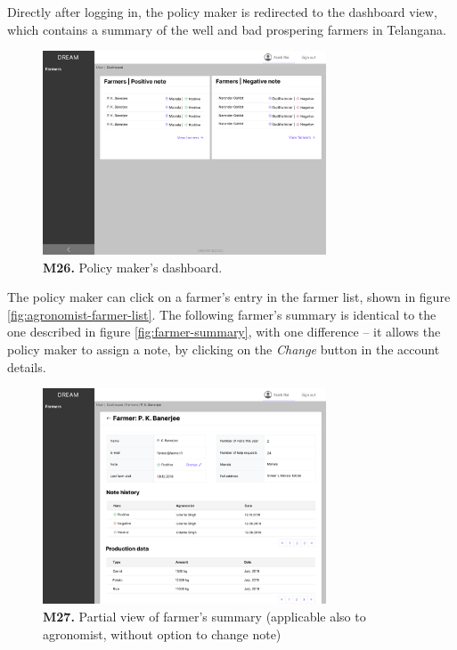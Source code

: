     Directly after logging in, the policy maker is redirected to the dashboard view, which contains a summary of the well and bad prospering farmers in Telangana.
    \begin{figure}[H]
        \centering
        \includegraphics[width=0.75\textwidth]{mockups/Policy maker_Dashboard.png}
        \caption{\textbf{M26.} Policy maker's dashboard.}
    \end{figure}
    
    The policy maker can click on a farmer's entry in the farmer list, shown in figure \ref{fig:agronomist-farmer-list}. The following farmer's summary is identical to the one described in figure \ref{fig:farmer-summary}, with one difference – it allows the policy maker to assign a note, by clicking on the \textit{Change} button in the account details.
    \begin{figure}[H]
        \centering
        \includegraphics[width=0.75\textwidth]{mockups/Policy maker_Dashboard_Farmers_Farmer_part1.png}
        \caption{\textbf{M27.} Partial view of farmer's summary (applicable also to agronomist, without option to change note)}
    \end{figure}
    
